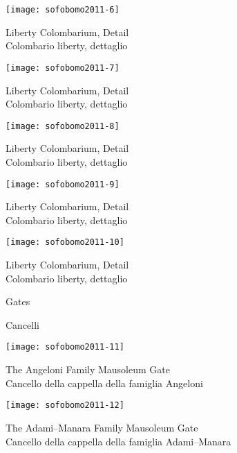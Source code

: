\begin{center}
\texttt{[image: sofobomo2011-6]}

{Liberty Colombarium, Detail}\\
{\footnotesize Colombario liberty, dettaglio}
\vspace*{\fill}
\newpage

\texttt{[image: sofobomo2011-7]}

{Liberty Colombarium, Detail}\\
{\footnotesize Colombario liberty, dettaglio}
\vspace*{\fill}
\newpage

\texttt{[image: sofobomo2011-8]}

{Liberty Colombarium, Detail}\\
{\footnotesize Colombario liberty, dettaglio}
\vspace*{\fill}
\newpage

\texttt{[image: sofobomo2011-9]}

{Liberty Colombarium, Detail}\\
{\footnotesize Colombario liberty, dettaglio}
\vspace*{\fill}
\newpage

\texttt{[image: sofobomo2011-10]}

{Liberty Colombarium, Detail}\\
{\footnotesize Colombario liberty, dettaglio}
\vspace*{\fill}
\newpage

\pagestyle{empty}
\vspace*{2in}

\hfill{\textsf{\Huge Gates}}

\hfill{\textsf{\LARGE Cancelli}}

\clearpage{\pagestyle{empty}\cleardoublepage}

\pagestyle{plain}

\texttt{[image: sofobomo2011-11]}

{The Angeloni Family Mausoleum Gate}\\
{\footnotesize Cancello della cappella della famiglia Angeloni}
\vspace*{\fill}
\newpage

\texttt{[image: sofobomo2011-12]}

{The Adami--Manara Family Mausoleum Gate}\\
{\footnotesize Cancello della cappella della famiglia Adami--Manara}
\vspace*{\fill}
\newpage


\end{center}
